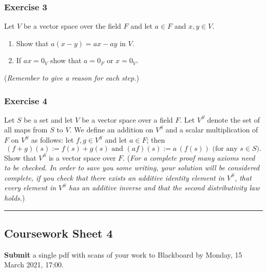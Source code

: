 \documentclass[
  12pt,
  a4paper,
  twoside]{article}
\theoremstyle{plain}
\theoremstyle{definition}
\begin{document}
\hypertarget{exercise-3-3}{%
\subsubsection*{Exercise 3}\label{exercise-3-3}}

Let \(V\) be a vector space over the field \(F\) and let \(a\in F\)
and \(x,y \in V\).

\begin{enumerate}
\def\labelenumi{(\alph{enumi})}
\item
  Show that \(a(x-y) = ax-ay\) in \(V\).
\item
  If \(ax=0_V\) show that \(a=0_F\) or \(x=0_V\).
\end{enumerate}

(\emph{Remember to give a reason for each step.})

\hypertarget{exercise-4-2}{%
\subsubsection*{Exercise 4}\label{exercise-4-2}}

Let \(S\) be a set and let \(V\) be a vector space over a field
\(F\). Let \(V^S\) denote the set of all maps from \(S\) to \(V\). We
define an addition on \(V^S\) and a scalar multiplication of \(F\)
on \(V^S\) as follows: let \(f,g \in V^S\) and let \(a \in F\); then
\[(f+g)(s) := f(s) + g(s) \textrm{ and } (af)(s) := a\, (f(s))
\textrm{ (for any } s \in S).\] Show that \(V^S\) is a vector
space over \(F\). (\emph{For a complete proof many axioms need to be checked. In order
to save you some writing, your solution will be considered complete, if you
check that there exists an additive identity element in \(V^S\), that every
element in \(V^S\) has an additive inverse and that the second distributivity law
holds.})

\begin{center}\rule{0.5\linewidth}{0.5pt}\end{center}

\hypertarget{coursework-sheet-4}{%
\subsection{Coursework Sheet 4}\label{coursework-sheet-4}}

\textbf{Submit} a single pdf with scans of your work to Blackboard by Monday, 15 March 2021, 17:00.
\end{document}
